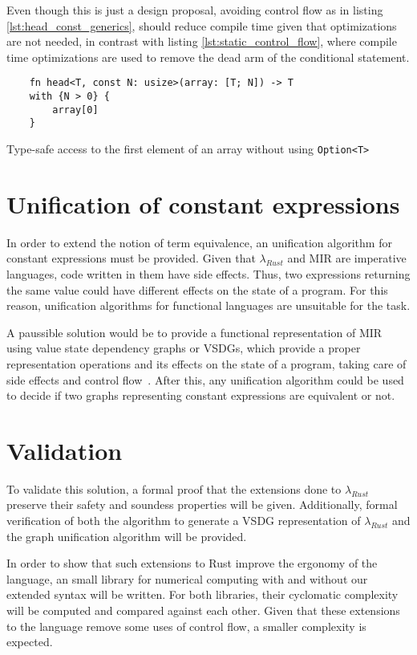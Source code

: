 Even though this is just a design proposal, avoiding control flow as in listing
\ref{lst:head_const_generics}, should reduce compile time given that
optimizations are not needed, in contrast with listing
\ref{lst:static_control_flow}, where compile time optimizations are used to
remove the dead arm of the conditional statement.

\begin{listing}[ht]
	\begin{verbatim}
    fn head<T, const N: usize>(array: [T; N]) -> T
    with {N > 0} {
        array[0]
    }
    \end{verbatim}
    \caption{Type-safe access to the first element of an array without using
    \texttt{Option<T>}}
  \label{lst:head_const_generics}
\end{listing}

\section{Unification of constant expressions}

In order to extend the notion of term equivalence, an unification algorithm for
constant expressions must be provided. Given that $\lambda_{Rust}$ and MIR are
imperative languages, code written in them have side effects. Thus, two
expressions returning the same value could have different effects on the state
of a program. For this reason, unification algorithms for functional languages
are unsuitable for the task. 

A paussible solution would be to provide a functional representation of MIR
using value state dependency graphs or VSDGs, which provide a proper
representation operations and its effects on the state of a program, taking care
of side
effects and control flow~\cite{vsdg}. After this, any unification algorithm
could be used to decide if two graphs representing constant expressions are
equivalent or not.

\section{Validation}

To validate this solution, a formal proof that the extensions done to
$\lambda_{Rust}$ preserve their safety and soundess properties will be given.
Additionally, formal verification of both the algorithm to generate a VSDG
representation of $\lambda_{Rust}$ and the graph unification algorithm will be
provided.

In order to show that such extensions to Rust improve the ergonomy of the
language, an small library for numerical computing with and without our extended
syntax will be written. For both libraries, their cyclomatic complexity will be
computed and compared against each other. Given that these extensions to the
language remove some uses of control flow, a smaller complexity is expected.
